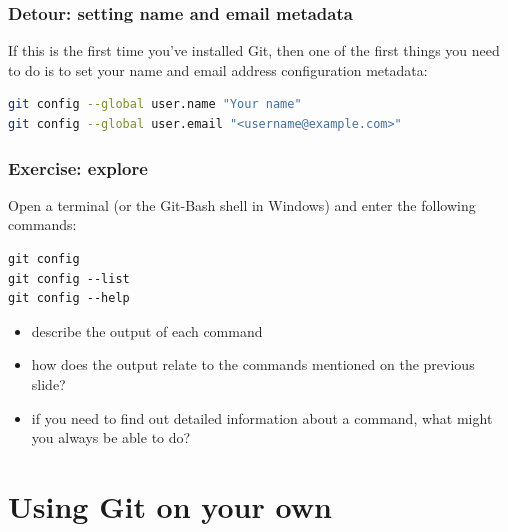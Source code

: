 \documentclass{git_course}
\begin{document}
\begin{frame}[fragile]
    \frametitle{Detour: setting name and email metadata}
    If this is the first time you've installed Git, then one of the first
    things you need to do is to set your name and email address
    configuration metadata:
\begin{lstlisting}[language=bash]
git config --global user.name "Your name"
git config --global user.email "<username@example.com>"
\end{lstlisting}
\end{frame}

\begin{frame}[fragile]
    \frametitle{Exercise: explore }

    Open a terminal (or the Git-Bash shell in Windows) and enter the
    following commands:
\begin{lstlisting}
git config
git config --list
git config --help
\end{lstlisting}

    \begin{itemize}
        \item describe the output of each command
        \item how does the output relate to the commands mentioned on the
            previous slide?
        \item if you need to find out detailed information about a command,
            what might you always be able to do?
    \end{itemize}
\end{frame}

\section{Using Git on your own}
\end{document}
